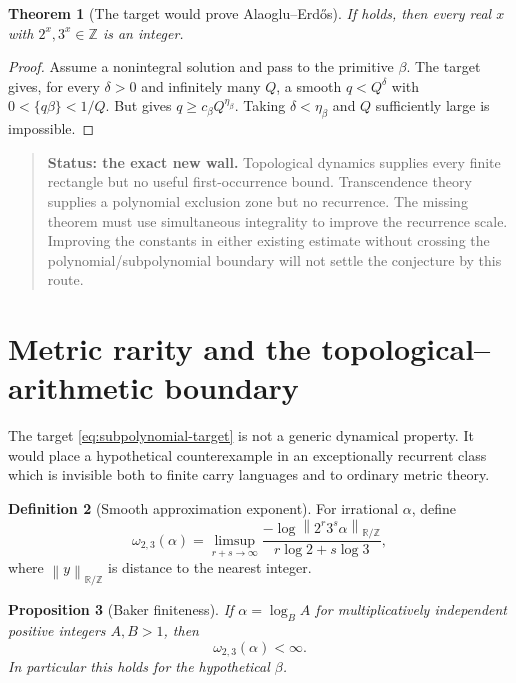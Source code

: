\documentclass[11pt]{article}
\newtheorem{theorem}{Theorem}[section]
\newtheorem{proposition}[theorem]{Proposition}
\theoremstyle{definition}
\newtheorem{definition}[theorem]{Definition}
\theoremstyle{remark}
\newcommand{\Z}{\mathbb Z}
\newcommand{\R}{\mathbb R}
\newcommand{\norm}[1]{\left\lVert#1\right\rVert}
\newenvironment{statusbox}[1]
{\begin{quote}\small\noindent\textbf{Status: #1.}\quad}
{\end{quote}}
\begin{document}
\begin{theorem}[The target would prove Alaoglu--Erd\H{o}s]
\label{thm:target-closes}
If  holds, then every real $x$ with
$2^x,3^x\in\Z$ is an integer.
\end{theorem}

\begin{proof}
Assume a nonintegral solution and pass to the primitive $\beta$.  The target gives,
for every $\delta>0$ and infinitely many $Q$, a smooth $q<Q^\delta$ with
$0<\{q\beta\}<1/Q$.  But  gives
$q\ge c_\beta Q^{\eta_\beta}$.  Taking $\delta<\eta_\beta$ and $Q$ sufficiently
large is impossible.
\end{proof}

\begin{statusbox}{the exact new wall}
Topological dynamics supplies every finite rectangle but no useful first-occurrence
bound.  Transcendence theory supplies a polynomial exclusion zone but no recurrence.
The missing theorem must use simultaneous integrality to improve the recurrence
scale.  Improving the constants in either existing estimate without crossing the
polynomial/subpolynomial boundary will not settle the conjecture by this route.
\end{statusbox}

\section{Metric rarity and the topological--arithmetic boundary}
\label{sec:metric-rarity}

The target \eqref{eq:subpolynomial-target} is not a generic dynamical property.  It
would place a hypothetical counterexample in an exceptionally recurrent class which
is invisible both to finite carry languages and to ordinary metric theory.

\begin{definition}[Smooth approximation exponent]
For irrational $\alpha$, define
\begin{equation}\label{eq:smooth-omega}
 \omega_{2,3}(\alpha)=
 \limsup_{r+s\to\infty}
 \frac{-\log\norm{2^r3^s\alpha}_{\R/\Z}}
      {r\log2+s\log3},
\end{equation}
where $\norm{y}_{\R/\Z}$ is distance to the nearest integer.
\end{definition}

\begin{proposition}[Baker finiteness]
If $\alpha=\log_B A$ for multiplicatively independent positive integers
$A,B>1$, then
\begin{equation}\label{eq:omega-finite}
 \omega_{2,3}(\alpha)<\infty.
\end{equation}
In particular this holds for the hypothetical $\beta$.
\end{proposition}
\end{document}
